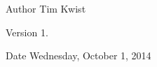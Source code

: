 \begin{DoxyAuthor}{Author}
Tim Kwist 
\end{DoxyAuthor}
\begin{DoxyVersion}{Version}
1. 
\end{DoxyVersion}
\begin{DoxyDate}{Date}
Wednesday, October 1, 2014 
\end{DoxyDate}

